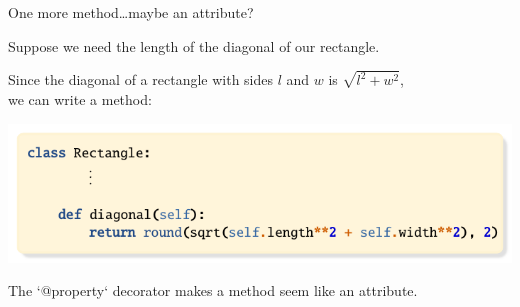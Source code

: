 \documentclass[aspectratio=149, ] {beamer}
\begin{document}
\begin{frame}[fragile]{One more method\dots maybe an attribute?}
  
  Suppose we need the length of the diagonal of our rectangle.
  
  \pause \smallskip
  
  Since the diagonal of a rectangle with sides $l$ and $w$ 
  is $\sqrt{l^2 + w^2}$,\\[-1pt]
  we can write a method:
  
  \smallskip \pause
   
  \includegraphics[page=2]{diagonal}
  
  The \inline`@property` decorator makes a method seem like an
  attribute.
  
  
\end{frame}
\end{document}
